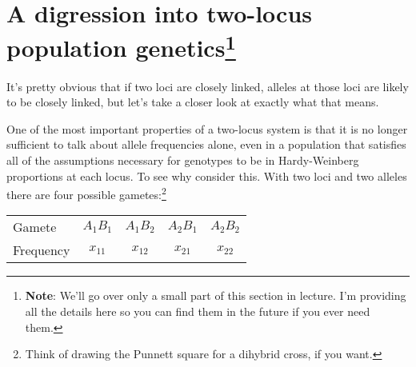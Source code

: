 \documentclass[12pt]{article}
\begin{document}
\section*{A digression into two-locus population
  genetics\footnote{{\bf Note}: We'll go over only a small part of
  this section in lecture. I'm providing all the details here so you
  can find them in the future if you ever need them.}}

It's pretty obvious that if two loci are closely linked, alleles at
those loci are likely to be closely linked, but let's take a closer
look at exactly what that means. 

One of the most important properties of a two-locus system is that it
is no longer sufficient to talk about allele frequencies alone, even
in a population that satisfies all of the assumptions necessary for
genotypes to be in Hardy-Weinberg proportions at each locus. To see
why consider this. With two loci and two alleles there are four
possible gametes:\footnote{Think of drawing the Punnett square for a
  dihybrid cross, if you want.}

\begin{center}
\begin{tabular}{lcccc}
Gamete    & $A_1B_1$ & $A_1B_2$ & $A_2B_1$ & $A_2B_2$ \\
Frequency & $x_{11}$ & $x_{12}$ & $x_{21}$ & $x_{22}$
\end{tabular}
\end{center}
\end{document}
